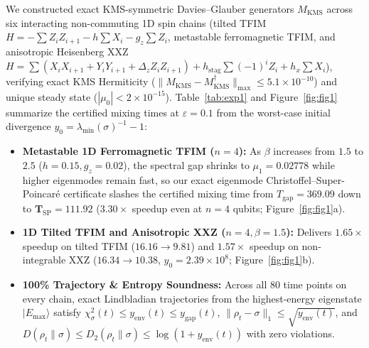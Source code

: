 \documentclass[11pt,a4paper]{article}
\theoremstyle{definition}
\newcommand{\KMS}{\mathrm{KMS}}
\begin{document}
We constructed exact KMS-symmetric Davies--Glauber generators $M_{\KMS}$ across six interacting non-commuting 1D spin chains (tilted TFIM $H = -\sum Z_i Z_{i+1} - h\sum X_i - g_z\sum Z_i$, metastable ferromagnetic TFIM, and anisotropic Heisenberg XXZ $H = \sum (X_i X_{i+1} + Y_i Y_{i+1} + \Delta_z Z_i Z_{i+1}) + h_{\mathrm{stag}}\sum (-1)^i Z_i + h_x\sum X_i$), verifying exact KMS Hermiticity ($\|M_{\KMS} - M_{\KMS}^\dagger\|_{\max} \le 5.1 \times 10^{-10}$) and unique steady state ($|\mu_0| < 2 \times 10^{-15}$). Table~\ref{tab:exp1} and Figure~\ref{fig:fig1} summarize the certified mixing times at $\varepsilon = 0.1$ from the worst-case initial divergence $y_0 = \lambda_{\min}(\sigma)^{-1} - 1$:
\begin{itemize}[leftmargin=1.6em,itemsep=2pt]
  \item \textbf{Metastable 1D Ferromagnetic TFIM ($n = 4$):} As $\beta$ increases from $1.5$ to $2.5$ ($h = 0.15, g_z = 0.02$), the spectral gap shrinks to $\mu_1 = 0.02778$ while higher eigenmodes remain fast, so our exact eigenmode Christoffel--Super-Poincar\'e certificate slashes the certified mixing time from $T_{\mathrm{gap}} = 369.09$ down to $\mathbf{T_{\mathrm{SP}} = 111.92}$ ($\mathbf{3.30\times}$ speedup even at $n = 4$ qubits; Figure~\ref{fig:fig1}a).
  \item \textbf{1D Tilted TFIM and Anisotropic XXZ ($n = 4, \beta = 1.5$):} Delivers $\mathbf{1.65\times}$ speedup on tilted TFIM ($16.16 \to 9.81$) and $\mathbf{1.57\times}$ speedup on non-integrable XXZ ($16.34 \to 10.38$, $y_0 = 2.39 \times 10^8$; Figure~\ref{fig:fig1}b).
  \item \textbf{100\% Trajectory \& Entropy Soundness:} Across all 80 time points on every chain, exact Lindbladian trajectories from the highest-energy eigenstate $|E_{\max}\rangle$ satisfy $\chi^2_\sigma(t) \le y_{\mathrm{env}}(t) \le y_{\mathrm{gap}}(t)$, $\|\rho_t - \sigma\|_1 \le \sqrt{y_{\mathrm{env}}(t)}$, and $D(\rho_t\|\sigma) \le D_2(\rho_t\|\sigma) \le \log(1 + y_{\mathrm{env}}(t))$ with zero violations.
\end{itemize}
\end{document}
